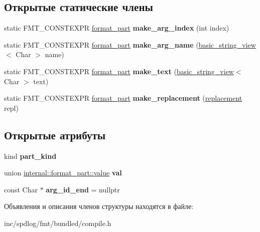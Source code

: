 \subsection*{Открытые статические члены}
\begin{DoxyCompactItemize}
\item 
\mbox{\label{structinternal_1_1format__part_a8250e8a0524562b5d8e3e224f8dd677d}} 
static F\+M\+T\+\_\+\+C\+O\+N\+S\+T\+E\+X\+PR \hyperlink{structinternal_1_1format__part}{format\+\_\+part} {\bfseries make\+\_\+arg\+\_\+index} (int index)
\item 
\mbox{\label{structinternal_1_1format__part_af28047fa4c076ebceade6ba3a2047571}} 
static F\+M\+T\+\_\+\+C\+O\+N\+S\+T\+E\+X\+PR \hyperlink{structinternal_1_1format__part}{format\+\_\+part} {\bfseries make\+\_\+arg\+\_\+name} (\hyperlink{classbasic__string__view}{basic\+\_\+string\+\_\+view}$<$ Char $>$ name)
\item 
\mbox{\label{structinternal_1_1format__part_a0347f3b7d268562145de9b9fb2b7e7d0}} 
static F\+M\+T\+\_\+\+C\+O\+N\+S\+T\+E\+X\+PR \hyperlink{structinternal_1_1format__part}{format\+\_\+part} {\bfseries make\+\_\+text} (\hyperlink{classbasic__string__view}{basic\+\_\+string\+\_\+view}$<$ Char $>$ text)
\item 
\mbox{\label{structinternal_1_1format__part_af9b59310be72b834c370b378c220b878}} 
static F\+M\+T\+\_\+\+C\+O\+N\+S\+T\+E\+X\+PR \hyperlink{structinternal_1_1format__part}{format\+\_\+part} {\bfseries make\+\_\+replacement} (\hyperlink{structinternal_1_1format__part_1_1replacement}{replacement} repl)
\end{DoxyCompactItemize}
\subsection*{Открытые атрибуты}
\begin{DoxyCompactItemize}
\item 
\mbox{\label{structinternal_1_1format__part_aec1b3df9ddd60e227fb4760638073fb1}} 
kind {\bfseries part\+\_\+kind}
\item 
\mbox{\label{structinternal_1_1format__part_a9dd1cb2745c30c2e9654945afd8ea315}} 
union \hyperlink{unioninternal_1_1format__part_1_1value}{internal\+::format\+\_\+part\+::value} {\bfseries val}
\item 
\mbox{\label{structinternal_1_1format__part_ab54e438237c49ff2cd0c826dcad3fc18}} 
const Char $\ast$ {\bfseries arg\+\_\+id\+\_\+end} = nullptr
\end{DoxyCompactItemize}


Объявления и описания членов структуры находятся в файле\+:\begin{DoxyCompactItemize}
\item 
inc/spdlog/fmt/bundled/compile.\+h\end{DoxyCompactItemize}
